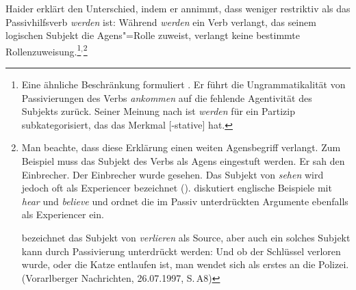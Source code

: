 %
Haider erklärt den Unterschied, indem er annimmt, dass \sein 
weniger restriktiv als das Passivhilfsverb \emph{werden} ist: Während \emph{werden} ein
Verb verlangt, das seinem logischen Subjekt die Agens"=Rolle
zuweist, verlangt \sein keine bestimmte Rollenzuweisung.\footnote{
        Eine ähnliche Beschränkung formuliert \citet[, ]{Toman86a}. Er führt
        die Ungrammatikalität von Passivierungen des Verbs \emph{ankommen} auf
        die fehlende Agentivität des Subjekts zurück. Seiner Meinung nach ist 
        \emph{werden} für ein Partizip subkategorisiert, das das Merkmal [-stative] hat.%
}$^,$\footnote{
        Man beachte, dass diese Erklärung einen weiten Agensbegriff verlangt. Zum Beispiel
        muss das Subjekt des Verbs  als Agens eingestuft werden.
        \eal
        \ex Er sah den Einbrecher.
        \ex Der Einbrecher wurde gesehen.
        \zl
        Das Subjekt von \emph{sehen} wird jedoch oft als Experiencer bezeichnet (\zb \citealp[]{Devlin92}). \citet[]{Dowty2000a} diskutiert englische
        Beispiele mit \emph{hear} und \emph{believe} und ordnet die im Passiv unterdrückten
        Argumente ebenfalls als Experiencer ein.%


\citet[]{Abraham2005a} bezeichnet das Subjekt von \emph{verlieren} als Source, aber auch ein
solches Subjekt kann durch Passivierung unterdrückt werden:
\ea
Und ob der Schlüssel verloren wurde, oder die Katze entlaufen ist, man wendet sich als erstes an die Polizei.
(Vorarlberger Nachrichten, 26.07.1997, S.\,A8)
\z

}

